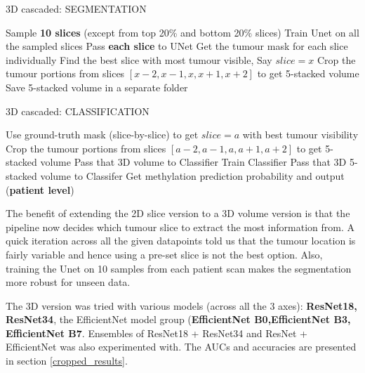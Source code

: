 \begin{algorithm}[H]
\caption{3D cascaded: SEGMENTATION}\label{alg:3D_cascaded_1}
\begin{algorithmic}[1]
\vspace*{2mm}
        \State Sample \textbf{10 slices} (except from top 20\% and bottom 20\% slices)
        \State Train Unet on all the sampled slices 
\EndFor
{}
    \State Pass \textbf{each slice} to UNet
    \State Get the tumour mask for each slice individually
    \State Find the best slice with most tumour visible, Say $slice = x$
    \State Crop the tumour portions from slices $[x-2, x-1,x,x+1,x+2]$ to get 5-stacked volume
    \State Save 5-stacked volume in a separate folder
\EndFor

\end{algorithmic}
\end{algorithm}
\vspace*{2mm}
\begin{algorithm}[H]
\caption{3D cascaded: CLASSIFICATION}\label{alg:3D_cascaded_2}
\begin{algorithmic}[1]
\vspace*{4mm}
        \State Use ground-truth mask (slice-by-slice) to get $slice=a$ with best tumour visibility
        \State Crop the tumour portions from slices $[a-2, a-1,a,a+1,a+2]$ to get 5-stacked volume
        \State Pass that 3D volume to Classifier
        \State Train Classifier
\EndFor
\State 
{}
    \State Pass that 3D 5-stacked volume to Classifer
    \State Get methylation prediction probability and output (\textbf{patient level})
\EndFor

\end{algorithmic}
\end{algorithm}
\vspace*{4mm}
The benefit of extending the 2D slice version to a 3D volume version is that the pipeline now decides which tumour slice to extract the most information from. A quick iteration across all the given datapoints told us that the tumour location is fairly variable and hence using a pre-set slice is not the best option. Also, training the Unet on 10 samples from each patient scan makes the segmentation more robust for unseen data.
\vspace*{4mm}

The 3D version was tried with various models (across all the 3 axes): \textbf{ResNet18, ResNet34}, the EfficientNet model group (\textbf{EfficientNet B0,EfficientNet B3, EfficientNet B7}. Ensembles of ResNet18 + ResNet34 and ResNet + EfficientNet was also experimented with. The AUCs and accuracies are presented in section \ref{cropped_results}.
\\
\\
\\
